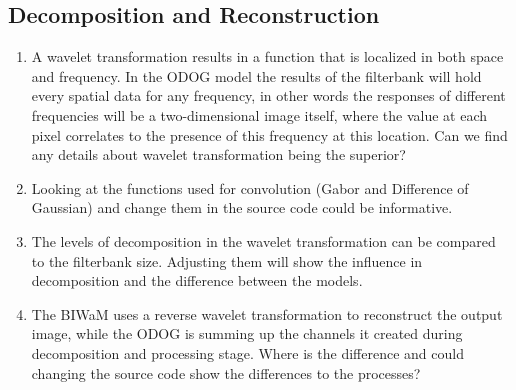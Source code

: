 \subsection*{Decomposition and Reconstruction}
\begin{enumerate}
    \item A wavelet transformation results in a function that is localized in both space
    and frequency. In the ODOG model the results of the filterbank will hold every spatial
    data for any frequency, in other words the responses of different frequencies will be
    a two-dimensional image itself, where the value at each pixel correlates to the
    presence of this frequency at this location. Can we find any details about wavelet
    transformation being the superior?
    \item Looking at the functions used for convolution (Gabor and Difference of Gaussian)
    and change them in the source code could be informative.
    \item The levels of decomposition in the wavelet transformation can be compared to
    the filterbank size. Adjusting them will show the influence in decomposition and the
    difference between the models.
    \item The BIWaM uses a reverse wavelet transformation to reconstruct the output image,
    while the ODOG is summing up the channels it created during decomposition and
    processing stage. Where is the difference and could changing the source code show
    the differences to the processes?
\end{enumerate}


